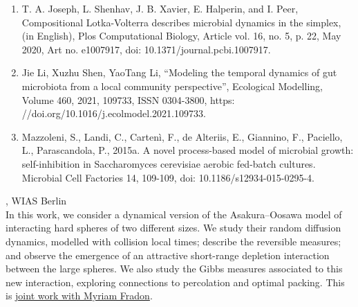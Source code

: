 \documentclass[12pt,a4paper]{article}
\begin{document}
 \begin{enumerate} \item T. A. Joseph, L. Shenhav, J. B. Xavier, E. Halperin, and I. Peer, Compositional Lotka-Volterra describes microbial dynamics in the simplex, (in English), Plos Computational Biology, Article vol. 16, no. 5, p. 22, May 2020, Art no. e1007917, doi: 10.1371/journal.pcbi.1007917. 
 \item Jie Li, Xuzhu Shen, YaoTang Li, “Modeling the temporal dynamics of gut microbiota from a local community perspective”, Ecological Modelling, Volume 460, 2021,            109733, ISSN 0304-3800, https: //doi.org/10.1016/j.ecolmodel.2021.109733. 
 \item Mazzoleni, S., Landi, C., Cartenì, F., de Alteriis, E., Giannino, F., Paciello, L., Parascandola, P.,             2015a. A novel process-based model of microbial growth: self-inhibition in Saccharomyces cerevisiae aerobic fed-batch cultures. Microbial Cell Factories 14, 109-109, doi: 10.1186/s12934-015-0295-4. \end{enumerate} 

\bigskip\bigskip

, WIAS Berlin \\[2ex] In this work, we consider a dynamical version of the Asakura--Oosawa model of interacting hard spheres of two different sizes. We study their random diffusion dynamics, modelled with collision local times; describe the reversible measures; and observe the emergence of an attractive short-range depletion interaction between the large spheres. We also study the Gibbs measures associated to this new interaction, exploring connections to percolation and optimal packing. This is \href{https://arxiv.org/abs/2502.15628}{joint work with Myriam Fradon}. 

\bigskip\bigskip

\newpage
\end{document}
